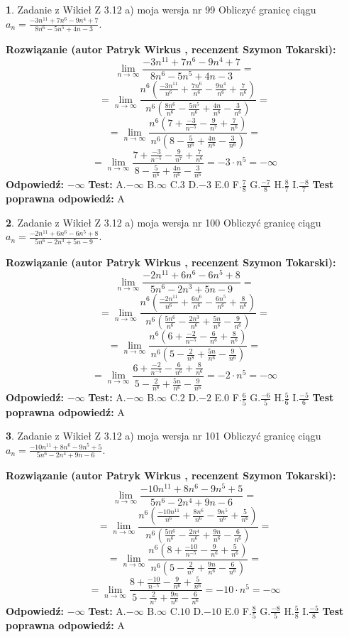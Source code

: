 \documentclass[12pt, a4paper]{article}
\theoremstyle{definition} %
\newtheorem{zad}{}
\newcommand{\zadStart}[1]{\begin{zad}#1\newline}
\newcommand{\zadStop}{\end{zad}}
\newcommand{\rozwStart}[2]{\noindent \textbf{Rozwiązanie (autor #1 , recenzent #2): }\newline}
\newcommand{\rozwStop}{\newline}
\newcommand{\odpStart}{\noindent \textbf{Odpowiedź:}\newline}
\newcommand{\odpStop}{\newline}
\newcommand{\testStart}{\noindent \textbf{Test:}\newline}
\newcommand{\testStop}{\newline}
\newcommand{\kluczStart}{\noindent \textbf{Test poprawna odpowiedź:}\newline}
\newcommand{\kluczStop}{\newline}
\begin{document}
\zadStart{Zadanie z Wikieł Z 3.12 a) moja wersja nr 99}
Obliczyć granicę ciągu $a_{n}=\frac{-3n^{11}+7n^{6}-9n^{4}+7}{8n^{6}-5n^{5}+4n-3}$.
\zadStop
\rozwStart{Patryk Wirkus}{Szymon Tokarski}
$$\lim\limits_{n\to\infty}\frac{-3n^{11}+7n^{6}-9n^{4}+7}{8n^{6}-5n^{5}+4n-3}=$$
$$=\lim\limits_{n\to\infty}\frac{n^{6}\left(\frac{-3n^{11}}{n^{6}}+\frac{7n^{6}}{n^{6}}-\frac{9n^{4}}{n^{6}}+\frac{7}{n^{6}}\right)}{n^{6}\left(\frac{8n^{6}}{n^{6}}-\frac{5n^{5}}{n^{6}}+\frac{4n}{n^{6}}-\frac{3}{n^{6}}\right)}=$$
$$=\lim\limits_{n\to\infty}\frac{n^{6}\left(7+\frac{-3}{n^{-5}}-\frac{9}{n^{7}}+\frac{7}{n^{6}}\right)}
{n^{6}\left(8-\frac{5}{n^{6}}+\frac{4n}{n^{6}}-\frac{3}{n^{6}}\right)}=$$
$$=\lim\limits_{n\to\infty}\frac{7+\frac{-3}{n^{-5}}-\frac{9}{n^{7}}+\frac{7}{n^{6}}}{8-\frac{5}{n^{6}}+\frac{4n}{n^{6}}-\frac{3}{n^{6}}}=-3\cdot n^{5} = -\infty$$
\rozwStop
\odpStart
$-\infty$
\odpStop
\testStart
A.$-\infty$
B.$\infty$
C.$3$
D.$-3$
E.$0$
F.$\frac{7}{8}$
G.$\frac{-7}{8}$
H.$\frac{8}{7}$
I.$\frac{-8}{7}$
\testStop
\kluczStart
A
\kluczStop



\zadStart{Zadanie z Wikieł Z 3.12 a) moja wersja nr 100}
Obliczyć granicę ciągu $a_{n}=\frac{-2n^{11}+6n^{6}-6n^{5}+8}{5n^{6}-2n^{3}+5n-9}$.
\zadStop
\rozwStart{Patryk Wirkus}{Szymon Tokarski}
$$\lim\limits_{n\to\infty}\frac{-2n^{11}+6n^{6}-6n^{5}+8}{5n^{6}-2n^{3}+5n-9}=$$
$$=\lim\limits_{n\to\infty}\frac{n^{6}\left(\frac{-2n^{11}}{n^{6}}+\frac{6n^{6}}{n^{6}}-\frac{6n^{5}}{n^{6}}+\frac{8}{n^{6}}\right)}{n^{6}\left(\frac{5n^{6}}{n^{6}}-\frac{2n^{3}}{n^{6}}+\frac{5n}{n^{6}}-\frac{9}{n^{6}}\right)}=$$
$$=\lim\limits_{n\to\infty}\frac{n^{6}\left(6+\frac{-2}{n^{-5}}-\frac{6}{n^{6}}+\frac{8}{n^{6}}\right)}
{n^{6}\left(5-\frac{2}{n^{8}}+\frac{5n}{n^{6}}-\frac{9}{n^{6}}\right)}=$$
$$=\lim\limits_{n\to\infty}\frac{6+\frac{-2}{n^{-5}}-\frac{6}{n^{6}}+\frac{8}{n^{6}}}{5-\frac{2}{n^{8}}+\frac{5n}{n^{6}}-\frac{9}{n^{6}}}=-2\cdot n^{5} = -\infty$$
\rozwStop
\odpStart
$-\infty$
\odpStop
\testStart
A.$-\infty$
B.$\infty$
C.$2$
D.$-2$
E.$0$
F.$\frac{6}{5}$
G.$\frac{-6}{5}$
H.$\frac{5}{6}$
I.$\frac{-5}{6}$
\testStop
\kluczStart
A
\kluczStop



\zadStart{Zadanie z Wikieł Z 3.12 a) moja wersja nr 101}
Obliczyć granicę ciągu $a_{n}=\frac{-10n^{11}+8n^{6}-9n^{5}+5}{5n^{6}-2n^{4}+9n-6}$.
\zadStop
\rozwStart{Patryk Wirkus}{Szymon Tokarski}
$$\lim\limits_{n\to\infty}\frac{-10n^{11}+8n^{6}-9n^{5}+5}{5n^{6}-2n^{4}+9n-6}=$$
$$=\lim\limits_{n\to\infty}\frac{n^{6}\left(\frac{-10n^{11}}{n^{6}}+\frac{8n^{6}}{n^{6}}-\frac{9n^{5}}{n^{6}}+\frac{5}{n^{6}}\right)}{n^{6}\left(\frac{5n^{6}}{n^{6}}-\frac{2n^{4}}{n^{6}}+\frac{9n}{n^{6}}-\frac{6}{n^{6}}\right)}=$$
$$=\lim\limits_{n\to\infty}\frac{n^{6}\left(8+\frac{-10}{n^{-5}}-\frac{9}{n^{6}}+\frac{5}{n^{6}}\right)}
{n^{6}\left(5-\frac{2}{n^{7}}+\frac{9n}{n^{6}}-\frac{6}{n^{6}}\right)}=$$
$$=\lim\limits_{n\to\infty}\frac{8+\frac{-10}{n^{-5}}-\frac{9}{n^{6}}+\frac{5}{n^{6}}}{5-\frac{2}{n^{7}}+\frac{9n}{n^{6}}-\frac{6}{n^{6}}}=-10\cdot n^{5} = -\infty$$
\rozwStop
\odpStart
$-\infty$
\odpStop
\testStart
A.$-\infty$
B.$\infty$
C.$10$
D.$-10$
E.$0$
F.$\frac{8}{5}$
G.$\frac{-8}{5}$
H.$\frac{5}{8}$
I.$\frac{-5}{8}$
\testStop
\kluczStart
A
\kluczStop
\end{document}
